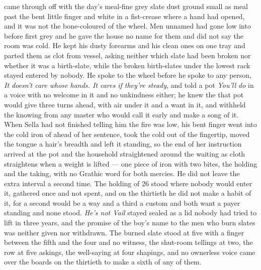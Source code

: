  came through  off  with the day's meal-fine grey slate dust ground small as meal past the bent little finger and white in a fist-crease where a hand had opened, and it was not the bone-coloured  of the wheel. Men unnamed had gone low into  before first grey and he gave the house no name for them and did not say the room was cold. He kept his dusty forearms and his clean ones on one tray and parted them as clot from vessel, asking neither which slate had been broken nor whether it was a birth-slate, while the broken birth-slates under the lowest rack stayed entered by nobody. He spoke to the wheel before he spoke to any person, \emph{It doesn't care whose hands. It cares if they're steady}, and told a pot \emph{You'll do} in a voice with no welcome in it and no unkindness either; he knew the  that pot would give three turns ahead, with air under it and a want in it, and withheld the knowing from any  master who would call it early and make a song of it. When Sella had not finished telling him the fire was low, his bent finger went into the cold iron of  ahead of her sentence, took the cold out of the fingertip, moved the tongue a hair's breadth and left it standing, so the end of her instruction arrived at the pot and the household straightened around the waiting as cloth straightens when a weight is lifted --- one piece of iron with two bites, the holding and the taking, with no Grathic word for both mercies. He did not leave the extra interval a second time. The holding of  26 stood where nobody would enter it, gathered once and not spent, and on the thirtieth he did not make a habit of it, for a second would be a way and a third a custom and both want a payer standing and none stood. \emph{He's not Vail} stayed sealed as a lid nobody had tried to lift in three years, and the promise of the boy's name to the men who burn slates was neither given nor withdrawn. The burned slate stood at five with a finger between the fifth and the four and no witness, the shut-room tellings at two, the row at five askings, the well-saying at four shapings, and no ownerless voice came over the boards on the thirtieth to make a sixth of any of them.

\scenebreak

